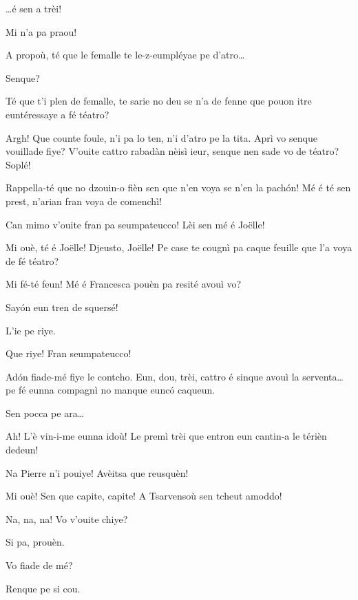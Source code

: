 \begin{drama}
\Pierrespeaks \ldots é sen a trèi! 

\Joelspeaks Mi n'a pa praou!

\Pierrespeaks{} A propoù, té que le femalle te le-z-eumpléyae pe d'atro\ldots

\Vetchotspeaks  Senque?

\Pierrespeaks{} Té que t'i plen de femalle, te sarie no deu se n'a de fenne que pouon itre euntéressaye a fé téatro?

\Vetchotspeaks  Argh! Que counte foule, n'i pa lo ten, n'i d’atro pe la tita. Aprì vo senque vouillade fiye? V'ouite cattro rabadàn nèisì ieur, senque nen sade vo de téatro? Soplé!
 
\Joelspeaks  Rappella-té que no dzouin-o fièn sen que n'en voya se n'en la pach\'on!  Mé é té sen prest, n'arian fran voya de comenchì!

\Francescaspeaks Can mimo v'ouite fran pa seumpateucco! Lèi sen mé é Jo\"{e}lle! 

\Pierrespeaks  Mi ouè, té é Jo\"{e}lle! Djeusto, Jo\"{e}lle! Pe case te cougnì pa caque feuille que l'a voya de fé téatro?
 
\Joellespeaks {} Mi fé-té feun! Mé é Francesca pouèn pa resité avouì vo?
  
\Joelspeaks Say\'on eun tren de squersé!

\Pierrespeaks L'ie pe riye.

\Francescaspeaks{} Que riye!
\Joellespeaks{} Fran seumpateucco! 

\Pierrespeaks Ad\'on fiade-mé fiye le contcho.  Eun, dou, trèi, cattro é sinque avouì la serventa\ldots pe fé eunna compagnì no manque euncó caqueun.

\Joelspeaks Sen pocca pe ara\ldots

\Pierrespeaks  Ah! L'è vin-i-me eunna idoù! Le premì trèi que entron eun cantin-a le térièn dedeun!

\Joelspeaks Na Pierre n'i pouiye! Avèitsa que reusquèn!

\Pierrespeaks Mi ouè! Sen que capite, capite! A Tsarvensoù sen tcheut amoddo!

\Joelspeaks Na, na, na!  Vo v'ouite chiye?

\Joellespeaks Si pa, prouèn.

\Pierrespeaks{} Vo fiade de mé?

\Francescaspeaks Renque pe si cou.


\end{drama}
